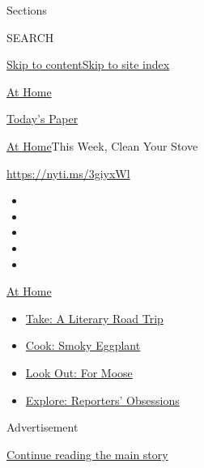 Sections

SEARCH

\protect\hyperlink{site-content}{Skip to
content}\protect\hyperlink{site-index}{Skip to site index}

\href{https://www.nytimes.com/spotlight/at-home}{At Home}

\href{https://myaccount.nytimes.com/auth/login?response_type=cookie\&client_id=vi}{}

\href{https://www.nytimes.com/section/todayspaper}{Today's Paper}

\href{/spotlight/at-home}{At Home}\textbar{}This Week, Clean Your Stove

\url{https://nyti.ms/3giyxWl}

\begin{itemize}
\item
\item
\item
\item
\item
\end{itemize}

\href{https://www.nytimes.com/spotlight/at-home?action=click\&pgtype=Article\&state=default\&region=TOP_BANNER\&context=at_home_menu}{At
Home}

\begin{itemize}
\tightlist
\item
  \href{https://www.nytimes.com/2020/07/28/books/time-for-a-literary-road-trip.html?action=click\&pgtype=Article\&state=default\&region=TOP_BANNER\&context=at_home_menu}{Take:
  A Literary Road Trip}
\item
  \href{https://www.nytimes.com/2020/07/29/magazine/bored-with-your-home-cooking-some-smoky-eggplant-will-fix-that.html?action=click\&pgtype=Article\&state=default\&region=TOP_BANNER\&context=at_home_menu}{Cook:
  Smoky Eggplant}
\item
  \href{https://www.nytimes.com/2020/07/27/travel/moose-michigan-isle-royale.html?action=click\&pgtype=Article\&state=default\&region=TOP_BANNER\&context=at_home_menu}{Look
  Out: For Moose}
\item
  \href{https://www.nytimes.com/interactive/2020/at-home/even-more-reporters-editors-diaries-lists-recommendations.html?action=click\&pgtype=Article\&state=default\&region=TOP_BANNER\&context=at_home_menu}{Explore:
  Reporters' Obsessions}
\end{itemize}

Advertisement

\protect\hyperlink{after-top}{Continue reading the main story}

